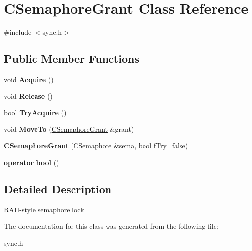 \hypertarget{class_c_semaphore_grant}{}\section{C\+Semaphore\+Grant Class Reference}
\label{class_c_semaphore_grant}


{\ttfamily \#include $<$sync.\+h$>$}

\subsection*{Public Member Functions}
\begin{DoxyCompactItemize}
\item 
\mbox{\label{class_c_semaphore_grant_ac52976968379ea8e2470cfba877c3e89}} 
void {\bfseries Acquire} ()
\item 
\mbox{\label{class_c_semaphore_grant_a8d985eeace74e037baeb39bd2d586576}} 
void {\bfseries Release} ()
\item 
\mbox{\label{class_c_semaphore_grant_a9952d9ea087ced803c099f69992ebb1d}} 
bool {\bfseries Try\+Acquire} ()
\item 
\mbox{\label{class_c_semaphore_grant_ab3e6f84f304703abc52517b0c8de26cf}} 
void {\bfseries Move\+To} (\mbox{\hyperlink{class_c_semaphore_grant}{C\+Semaphore\+Grant}} \&grant)
\item 
\mbox{\label{class_c_semaphore_grant_a5998c457c7c223a8257166161d12b355}} 
{\bfseries C\+Semaphore\+Grant} (\mbox{\hyperlink{class_c_semaphore}{C\+Semaphore}} \&sema, bool f\+Try=false)
\item 
\mbox{\label{class_c_semaphore_grant_a91458b860e45949d87d770252e590a9b}} 
{\bfseries operator bool} ()
\end{DoxyCompactItemize}


\subsection{Detailed Description}
R\+A\+I\+I-\/style semaphore lock 

The documentation for this class was generated from the following file\+:\begin{DoxyCompactItemize}
\item 
sync.\+h\end{DoxyCompactItemize}
